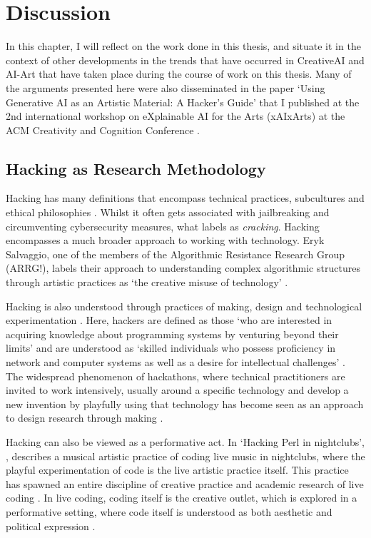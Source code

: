 \chapter{Discussion}
\label{ch:discussion}

In this chapter, I will reflect on the work done in this thesis, and situate it in the context of other developments in the trends that have occurred in CreativeAI and AI-Art that have taken place during the course of work on this thesis. 
Many of the arguments presented here were also disseminated in the paper `Using Generative AI as an Artistic Material: A Hacker's Guide’ that I published at the 2nd international workshop on eXplainable AI for the Arts (xAIxArts) at the ACM Creativity and Cognition Conference \citep{broad2024using}.


\section{Hacking as Research Methodology}

Hacking has many definitions that encompass technical practices, subcultures and ethical philosophies \citep{jordan2017genealogy}. 
Whilst it often gets associated with jailbreaking and circumventing cybersecurity measures, what \citep{stallman2002hacking} labels as \textit{cracking}.
Hacking encompasses a much broader approach to working with technology.
Eryk Salvaggio, one of the members of the Algorithmic Resistance Research Group (ARRG!), labels their approach to understanding complex algorithmic structures through artistic practices as `the creative misuse of technology' \citep{salvaggio2023cultural}.

Hacking is also understood through practices of making, design and technological experimentation \citep{hunsinger2016democratization}.
Here, hackers are defined as those `who are interested in acquiring knowledge about programming systems by venturing beyond their limits' and are understood as `skilled individuals who possess proficiency in network and computer systems as well as a desire for intellectual challenges' \citep{richterich2017introduction}.
The widespread phenomenon of hackathons, where technical practitioners are invited to work intensively, usually around a specific technology and develop a new invention by playfully using that technology has become seen as an approach to design research through making \citep{flus2021design, falk2022future, rys2023invention}.

Hacking can also be viewed as a performative act. In `Hacking Perl in nightclubs', \cite{mclean2004hacking}, describes a musical artistic practice of coding live music in nightclubs, where the playful experimentation of code is the live artistic practice itself. 
This practice has spawned an entire discipline of creative practice and academic research of live coding \citep{selvaraj2021live}.
In live coding, coding itself is the creative outlet, which is explored in a performative setting, where code itself is understood as both aesthetic and political expression \citep{cox2012speaking}.

